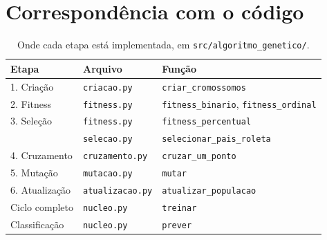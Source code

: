 \documentclass[11pt,a4paper]{article}
\newcommand{\cod}[1]{\texttt{#1}}
\begin{document}
\section{Correspondência com o código}

\begin{table}[ht]
\centering
\caption{Onde cada etapa está implementada, em \cod{src/algoritmo\_genetico/}.}
\begin{tabular}{lll}
\toprule
Etapa & Arquivo & Função \\
\midrule
1. Criação    & \cod{criacao.py}    & \cod{criar\_cromossomos} \\
2. Fitness    & \cod{fitness.py}    & \cod{fitness\_binario}, \cod{fitness\_ordinal} \\
3. Seleção    & \cod{fitness.py}    & \cod{fitness\_percentual} \\
              & \cod{selecao.py}    & \cod{selecionar\_pais\_roleta} \\
4. Cruzamento & \cod{cruzamento.py} & \cod{cruzar\_um\_ponto} \\
5. Mutação    & \cod{mutacao.py}    & \cod{mutar} \\
6. Atualização & \cod{atualizacao.py} & \cod{atualizar\_populacao} \\
Ciclo completo & \cod{nucleo.py}    & \cod{treinar} \\
Classificação & \cod{nucleo.py}     & \cod{prever} \\
\bottomrule
\end{tabular}
\end{table}
\end{document}
